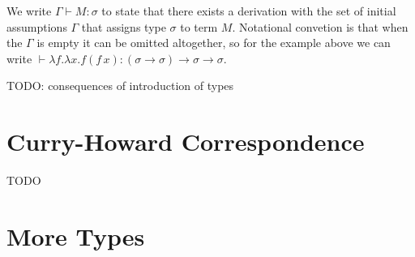 \documentclass[11pt,twoside,a4paper]{article} %
\begin{document}
We write $\Gamma\vdash M:\sigma$ to state that there exists a derivation with 
the set of initial assumptions $\Gamma$ that assigns type $\sigma$ to term $M$. 
Notational convetion is that when the $\Gamma$ is empty it
can be omitted altogether, so for the example above we can write
$\vdash \lambda f.\lambda x.f(f\,x):(\sigma\rightarrow\sigma)\rightarrow\sigma\rightarrow\sigma$.


TODO: consequences of introduction of types

\section{Curry-Howard Correspondence}

TODO

\section{More Types}
\end{document}
